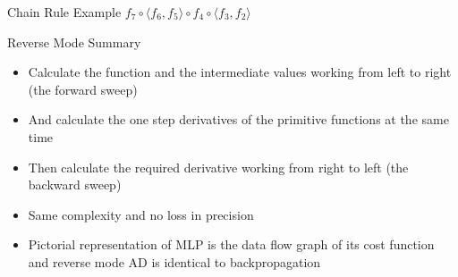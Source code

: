 \documentclass{beamer}
\begin{document}
\begin{frame}[fragile]{Chain Rule Example $f_7 \circ \langle f_6,
    f_5\rangle \circ f_4 \circ \langle f_3, f_2\rangle$}
\end{frame}

\begin{frame}[fragile]{Reverse Mode Summary}

\begin{itemize}
\pause
\item Calculate the function and the intermediate values working from
  left to right (the forward sweep)
\pause
\item And calculate the one step derivatives of the
  primitive functions at the same time
\pause
\item Then calculate the required derivative working from right to
  left (the backward sweep)
\pause
\item Same complexity and no loss in precision
\pause
\item Pictorial representation of MLP is the data flow graph of its cost
  function and reverse mode AD is identical to backpropagation
\end{itemize}

\end{frame}
\end{document}
